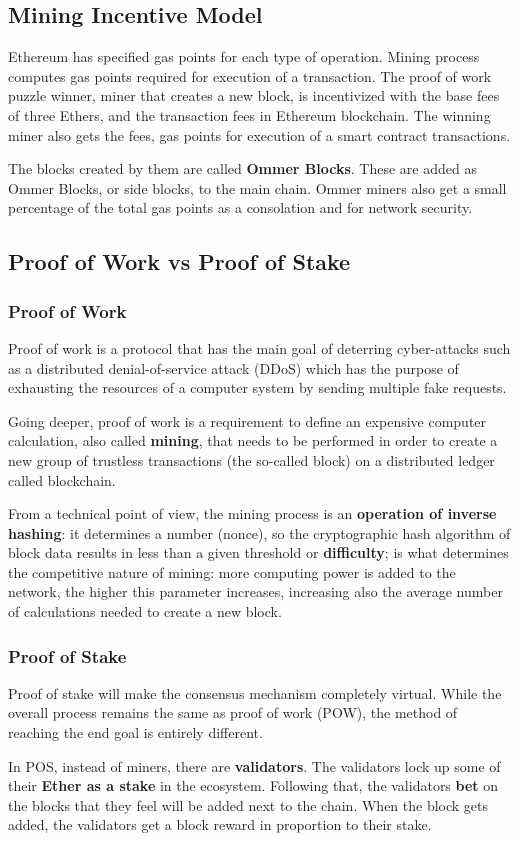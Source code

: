 \documentclass{article}
\begin{document}
\subsection{Mining Incentive Model}
Ethereum has specified gas points for each type of operation. Mining process computes gas points required for execution of a transaction. The proof of work puzzle winner, miner that creates a new block, is incentivized with the base fees of three Ethers, and the transaction fees in Ethereum blockchain. The winning miner also gets the fees, gas points for execution of a smart contract transactions.
\par  The blocks created by them are called \textbf{Ommer Blocks}. These are added as Ommer Blocks, or side blocks, to the main chain. Ommer miners also get a small percentage of the total gas points as a consolation and for network security. 
\subsection{Proof of Work vs Proof of Stake}
\subsubsection{Proof of Work}
Proof of work is a protocol that has the main goal of deterring cyber-attacks such as a distributed denial-of-service attack (DDoS) which has the purpose of exhausting the resources of a computer system by sending multiple fake requests.
\par
Going deeper, proof of work is a requirement to define an expensive computer calculation, also called \textbf{mining}, that needs to be performed in order to create a new group of trustless transactions (the so-called block) on a distributed ledger called blockchain.
\par
From a technical point of view, the mining process is an \textbf{operation of inverse hashing}: it determines a number (nonce), so the cryptographic hash algorithm of block data results in less than a given threshold or \textbf{difficulty}; is what determines the competitive nature of mining: more computing power is added to the network, the higher this parameter increases, increasing also the average number of calculations needed to create a new block.
\subsubsection{Proof of Stake}
Proof of stake will make the consensus mechanism completely virtual. While the overall process remains the same as proof of work (POW), the method of reaching the end goal is entirely different. \par
In POS, instead of miners, there are \textbf{validators}. The validators lock up some of their \textbf{Ether as a stake} in the ecosystem. Following that, the validators \textbf{bet} on the blocks that they feel will be added next to the chain. When the block gets added, the validators get a block reward in proportion to their stake.
\end{document}
